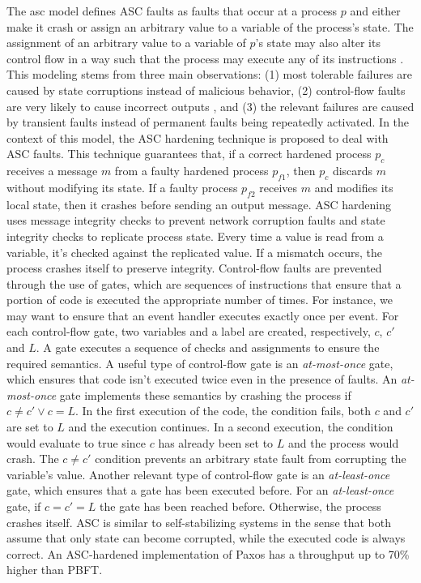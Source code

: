 The \acrfull{asc} model defines ASC faults as faults that occur at a process $p$ and either make it crash or assign an arbitrary value to a variable of the process's state. The assignment of an arbitrary value to a variable of $p$'s state may also alter its control flow in a way such that the process may execute any of its instructions \cite{Correia2012}. This modeling stems from three main observations: (1) most tolerable failures are caused by state corruptions instead of malicious behavior, (2) control-flow faults are very likely to cause incorrect outputs \cite{Kalbarczyk2003}, and (3) the relevant failures are caused by transient faults instead of permanent faults being repeatedly activated. In the context of this model, the ASC hardening technique is proposed to deal with ASC faults. This technique guarantees that, if a correct hardened process $p_c$ receives a message $m$ from a faulty hardened process $p_{f1}$, then $p_c$ discards $m$ without modifying its state. If a faulty process $p_{f2}$ receives $m$ and modifies its local state, then it crashes before sending an output message. ASC hardening uses message integrity checks to prevent network corruption faults and state integrity checks to replicate process state. Every time a value is read from a variable, it's checked against the replicated value. If a mismatch occurs, the process crashes itself to preserve integrity. Control-flow faults are prevented through the use of gates, which are sequences of instructions that ensure that a portion of code is executed the appropriate number of times. For instance, we may want to ensure that an event handler executes exactly once per event. For each control-flow gate, two variables and a label are created, respectively, $c$, $c'$ and $L$. A gate executes a sequence of checks and assignments to ensure the required semantics. A useful type of control-flow gate is an \textit{at-most-once} gate, which ensures that code isn't executed twice even in the presence of faults. An \textit{at-most-once} gate implements these semantics by crashing the process if $c \neq c' \vee c=L$. In the first execution of the code, the condition fails, both $c$ and $c'$ are set to $L$ and the execution continues. In a second execution, the condition would evaluate to true since $c$ has already been set to $L$ and the process would crash. The $c \neq c'$ condition prevents an arbitrary state fault from corrupting the variable's value. Another relevant type of control-flow gate is an \textit{at-least-once} gate, which ensures that a gate has been executed before. For an \textit{at-least-once} gate, if $c=c'=L$ the gate has been reached before. Otherwise, the process crashes itself. ASC is similar to self-stabilizing systems \cite{Dijkstra1974} in the sense that both assume that only state can become corrupted, while the executed code is always correct. An ASC-hardened implementation of Paxos has a throughput up to 70\% higher than PBFT. \par

